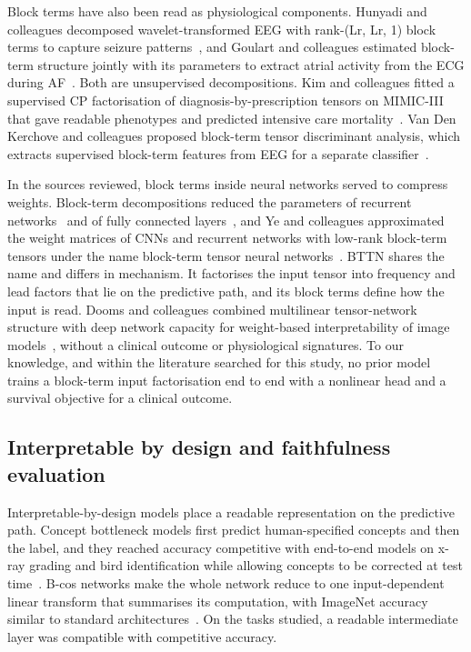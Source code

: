 \documentclass[preprint,12pt]{elsarticle}
\begin{document}
Block terms have also been read as physiological components. Hunyadi and colleagues decomposed wavelet-transformed EEG with rank-(Lr, Lr, 1) block terms to capture seizure patterns~\cite{hunyadi2014}, and Goulart and colleagues estimated block-term structure jointly with its parameters to extract atrial activity from the ECG during AF~\cite{goulart2020}. Both are unsupervised decompositions. Kim and colleagues fitted a supervised CP factorisation of diagnosis-by-prescription tensors on MIMIC-III that gave readable phenotypes and predicted intensive care mortality~\cite{kim2017}. Van Den Kerchove and colleagues proposed block-term tensor discriminant analysis, which extracts supervised block-term features from EEG for a separate classifier~\cite{vandenkerchove2025}.

In the sources reviewed, block terms inside neural networks served to compress weights. Block-term decompositions reduced the parameters of recurrent networks~\cite{ye2018} and of fully connected layers~\cite{li2017btnets}, and Ye and colleagues approximated the weight matrices of CNNs and recurrent networks with low-rank block-term tensors under the name block-term tensor neural networks~\cite{ye2020}. BTTN shares the name and differs in mechanism. It factorises the input tensor into frequency and lead factors that lie on the predictive path, and its block terms define how the input is read. Dooms and colleagues combined multilinear tensor-network structure with deep network capacity for weight-based interpretability of image models~\cite{dooms2025}, without a clinical outcome or physiological signatures. To our knowledge, and within the literature searched for this study, no prior model trains a block-term input factorisation end to end with a nonlinear head and a survival objective for a clinical outcome.

\subsection{Interpretable by design and faithfulness evaluation}

Interpretable-by-design models place a readable representation on the predictive path. Concept bottleneck models first predict human-specified concepts and then the label, and they reached accuracy competitive with end-to-end models on x-ray grading and bird identification while allowing concepts to be corrected at test time~\cite{koh2020}. B-cos networks make the whole network reduce to one input-dependent linear transform that summarises its computation, with ImageNet accuracy similar to standard architectures~\cite{bohle2022}. On the tasks studied, a readable intermediate layer was compatible with competitive accuracy.
\end{document}
